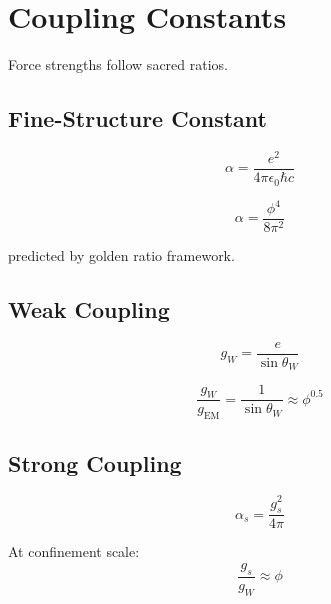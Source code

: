 \section{Coupling Constants}

Force strengths follow sacred ratios.

\subsection{Fine-Structure Constant}

\begin{definition}[Alpha]
\label{fa_20:def:alpha}
\begin{equation}
\alpha = \frac{e^2}{4\pi\epsilon_0\hbar c}
\end{equation}
\end{definition}

\begin{proposition}
\label{fa_20:prop:golden-alpha}
\begin{equation}
\alpha = \frac{\phi^4}{8\pi^2}
\end{equation}

predicted by golden ratio framework.
\end{proposition}

\subsection{Weak Coupling}

\begin{equation}
g_W = \frac{e}{\sin\theta_W}
\end{equation}

\begin{theorem}
\label{fa_20:thm:weak-golden}
\begin{equation}
\frac{g_W}{g_{\text{EM}}} = \frac{1}{\sin\theta_W} \approx \phi^{0.5}
\end{equation}
\end{theorem}

\subsection{Strong Coupling}

\begin{equation}
\alpha_s = \frac{g_s^2}{4\pi}
\end{equation}

\begin{theorem}
\label{fa_20:thm:strong-golden}
At confinement scale:
\begin{equation}
\frac{g_s}{g_W} \approx \phi
\end{equation}
\end{theorem}

